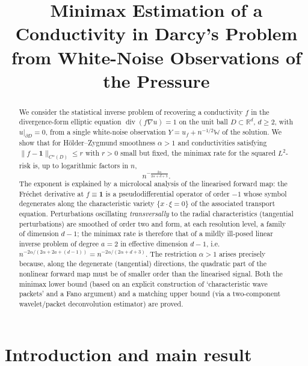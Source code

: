 \documentclass[11pt]{amsart}
\newcommand{\R}{\mathbb{R}}
\newcommand{\W}{\mathbb{W}}
\newcommand{\1}{\mathbf{1}}
\newcommand{\divop}{\operatorname{div}}
\begin{document}
\title{Minimax Estimation of a Conductivity in Darcy's Problem\\ from White-Noise Observations of the Pressure}
\author{}
\date{}

\begin{abstract}
We consider the statistical inverse problem of recovering a conductivity
$f$ in the divergence-form elliptic equation
$\divop(f\nabla u)=1$ on the unit ball $D\subset\R^d$, $d\ge 2$, with
$u|_{\partial D}=0$, from a single white-noise observation
$Y=u_f+n^{-1/2}\W$ of the solution. We show that for H\"older--Zygmund
smoothness $\alpha>1$ and conductivities satisfying
$\|f-\1\|_{C^\alpha(D)}\le r$ with $r>0$ small but fixed, the minimax rate
for the squared $L^2$-risk is, up to logarithmic factors in $n$,
\[
n^{-\frac{2\alpha}{2\alpha+d+3}} .
\]
The exponent is explained by a microlocal analysis of the linearised
forward map: the Fr\'echet derivative at $f\equiv\1$ is a pseudodifferential
operator of order $-1$ whose symbol degenerates along the characteristic
variety $\{x\cdot \xi=0\}$ of the associated transport equation. Perturbations
oscillating \emph{transversally} to the radial characteristics (tangential
perturbations) are smoothed of order two and form, at each resolution level,
a family of dimension $d-1$; the minimax rate is therefore that of a mildly
ill-posed linear inverse problem of degree $a=2$ in effective dimension
$d-1$, i.e.\ $n^{-2\alpha/(2\alpha+2a+(d-1))}=n^{-2\alpha/(2\alpha+d+3)}$.
The restriction $\alpha>1$ arises precisely because, along the degenerate
(tangential) directions, the quadratic part of the nonlinear forward map must
be of smaller order than the linearised signal. Both the minimax lower bound
(based on an explicit construction of `characteristic wave packets' and a
Fano argument) and a matching upper bound (via a two-component
wavelet/packet deconvolution estimator) are proved.
\end{abstract}

\maketitle

\tableofcontents

\section{Introduction and main result}\label{sec:intro}
\end{document}
